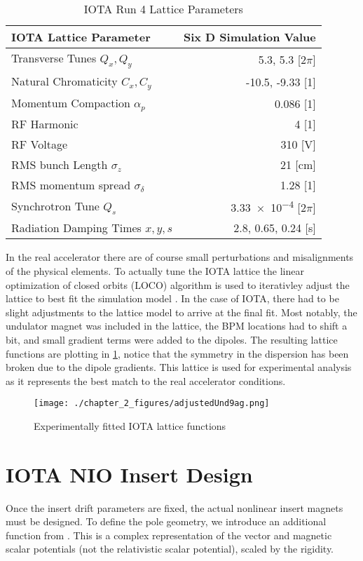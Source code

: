 \begin{table}
    \centering
    \begin{tabular}{lr}
    \toprule
    \textbf{IOTA Lattice Parameter} & \textbf{Six D Simulation Value}\\
    \midrule
    Transverse Tunes $Q_x,Q_y$ & 5.3, 5.3 [2$\pi$]\\ 
    Natural Chromaticity $C_x,C_y$ & -10.5, -9.33 [1]\\
    Momentum Compaction $\alpha_p$ & 0.086 [1]\\
    \midrule
    RF Harmonic & 4 [1]\\
    RF Voltage & 310 [V]\\
    RMS bunch Length $\sigma_z$ & 21 [cm]\\
    \midrule
    RMS momentum spread $\sigma_{\delta}$ & 1.28 [1]\\
    Synchrotron Tune $Q_s$ & \num{3.33e-4} [2$\pi$]\\
    Radiation Damping Times $x,y,s$ & 2.8, 0.65, 0.24 [s]\\
    \bottomrule
    \end{tabular}
    \caption{IOTA Run 4 Lattice Parameters}
    \label{tab:IOTAlattice}
\end{table}

In the real accelerator there are of course small perturbations and misalignments of the physical elements. To actually tune the IOTA lattice the linear optimization of closed orbits (LOCO) algorithm is used to iterativley adjust the lattice to best fit the simulation model \cite{romanovLatticeCorrectionModeling2014}. In the case of IOTA, there had to be slight adjustments to the lattice model to arrive at the final fit. Most notably, the undulator magnet was included in the lattice, the BPM locations had to shift a bit, and small gradient terms were added to the dipoles. The resulting lattice functions are plotting in \ref{fig:IOTAund9}, notice that the symmetry in the dispersion has been broken due to the dipole gradients. This lattice is used for experimental analysis as it represents the best match to the real accelerator conditions.

\begin{figure}
	\centering
	\texttt{[image: ./chapter\_2\_figures/adjustedUnd9ag.png]}
	\caption{Experimentally fitted IOTA lattice functions}
	\label{fig:IOTAund9}
\end{figure}


\section{IOTA NIO Insert Design} \label{sec:nioDesign}
Once the insert drift parameters are fixed, the actual nonlinear insert magnets must be designed. To define the pole geometry, we introduce an additional function from \cite{mitchellComplexRepresentationPotentials2019}. This is a complex representation of the vector and magnetic scalar potentials (not the relativistic scalar potential), scaled by the rigidity.

